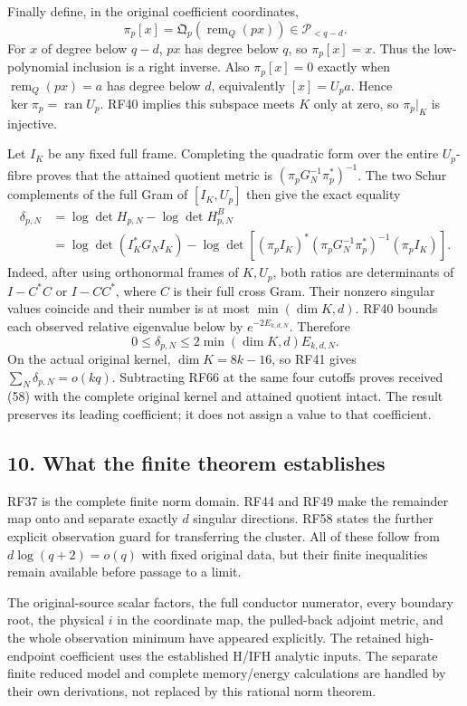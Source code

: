 \documentclass[11pt]{article}
\begin{document}
Finally define, in the original coefficient coordinates, \[
\pi_p[x]=\mathfrak Q_p(\operatorname{rem}_Q(px))
\in\mathcal P_{<q-d}.
\tag{RF65}
\] For \(x\) of degree below \(q-d\), \(px\) has degree below \(q\), so \(\pi_p[x]=x\). Thus the low-polynomial inclusion is a right inverse. Also \(\pi_p[x]=0\) exactly when \(\operatorname{rem}_Q(px)=a\) has degree below \(d\), equivalently \([x]=U_pa\). Hence \(\ker\pi_p=\operatorname{ran}U_p\). RF40 implies this subspace meets \(K\) only at zero, so \(\pi_p|_K\) is injective.

Let \(I_K\) be any fixed full frame. Completing the quadratic form over the entire \(U_p\)-fibre proves that the attained quotient metric is \((\pi_pG_N^{-1}\pi_p^*)^{-1}\). The two Schur complements of the full Gram of \([I_K,U_p]\) then give the exact equality \[
\begin{aligned}
\delta_{p,N}
&=\log\det H_{p,N}-\log\det H^B_{p,N}\\
&=\log\det(I_K^*G_NI_K)
-\log\det\!\left[
(\pi_pI_K)^*(\pi_pG_N^{-1}\pi_p^*)^{-1}(\pi_pI_K)\right].
\end{aligned}
\tag{RF66}
\] Indeed, after using orthonormal frames of \(K,U_p\), both ratios are determinants of \(I-C^*C\) or \(I-CC^*\), where \(C\) is their full cross Gram. Their nonzero singular values coincide and their number is at most \(\min(\dim K,d)\). RF40 bounds each observed relative eigenvalue below by \(e^{-2E_{k,d,N}}\). Therefore \[
0\le\delta_{p,N}\le2\min(\dim K,d)E_{k,d,N}.
\tag{RF67}
\] On the actual original kernel, \(\dim K=8k-16\), so RF41 gives \(\sum_N\delta_{p,N}=o(kq)\). Subtracting RF66 at the same four cutoffs proves received (58) with the complete original kernel and attained quotient intact. The result preserves its leading coefficient; it does not assign a value to that coefficient.

\subsection{10. What the finite theorem establishes}\label{what-the-finite-theorem-establishes}

RF37 is the complete finite norm domain. RF44 and RF49 make the remainder map onto and separate exactly \(d\) singular directions. RF58 states the further explicit observation guard for transferring the cluster. All of these follow from \(d\log(q+2)=o(q)\) with fixed original data, but their finite inequalities remain available before passage to a limit.

The original-source scalar factors, the full conductor numerator, every boundary root, the physical \(i\) in the coordinate map, the pulled-back adjoint metric, and the whole observation minimum have appeared explicitly. The retained high-endpoint coefficient uses the established H/IFH analytic inputs. The separate finite reduced model and complete memory/energy calculations are handled by their own derivations, not replaced by this rational norm theorem.
\end{document}
